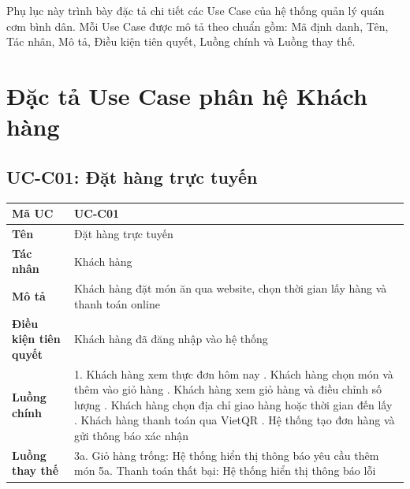 \documentclass[../20232006p.tex]{subfiles}
\begin{document}
Phụ lục này trình bày đặc tả chi tiết các Use Case của hệ thống quản lý quán cơm bình dân. Mỗi Use Case được mô tả theo chuẩn gồm: Mã định danh, Tên, Tác nhân, Mô tả, Điều kiện tiên quyết, Luồng chính và Luồng thay thế.

\section{Đặc tả Use Case phân hệ Khách hàng}

\subsection{UC-C01: Đặt hàng trực tuyến}
\begin{table}[H]
    \centering
    \begin{tabular}{|p{3.5cm}|p{10cm}|}
        \hline
        \textbf{Mã UC}                & UC-C01                                                                          \\
        \hline
        \textbf{Tên}                  & Đặt hàng trực tuyến                                                             \\
        \hline
        \textbf{Tác nhân}             & Khách hàng                                                                      \\
        \hline
        \textbf{Mô tả}                & Khách hàng đặt món ăn qua website, chọn thời gian lấy hàng và thanh toán online \\
        \hline
        \textbf{Điều kiện tiên quyết} & Khách hàng đã đăng nhập vào hệ thống                                            \\
        \hline
        \textbf{Luồng chính}          &
        1. Khách hàng xem thực đơn hôm nay \newline
        2. Khách hàng chọn món và thêm vào giỏ hàng \newline
        3. Khách hàng xem giỏ hàng và điều chỉnh số lượng \newline
        4. Khách hàng chọn địa chỉ giao hàng hoặc thời gian đến lấy \newline
        5. Khách hàng thanh toán qua VietQR \newline
        6. Hệ thống tạo đơn hàng và gửi thông báo xác nhận                                                              \\
        \hline
        \textbf{Luồng thay thế}       &
        3a. Giỏ hàng trống: Hệ thống hiển thị thông báo yêu cầu thêm món \newline
        5a. Thanh toán thất bại: Hệ thống hiển thị thông báo lỗi                                                        \\
        \hline
    \end{tabular}
\end{table}
\end{document}
